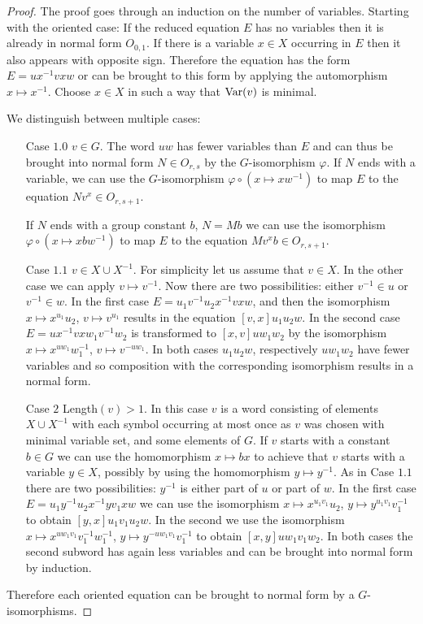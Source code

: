 \documentclass[a4paper,11pt]{amsart}
\begin{document}
\begin{proof}
  The proof goes through an induction on the number of variables.
  Starting with the oriented case: If the reduced equation $E$ has no
  variables then it is already in normal form $O_{0,1}$. If there is a
  variable $x\in X$ occurring in $E$ then it also appears with
  opposite sign.  Therefore the equation has the form
  $E = ux^{-1}vxw$ or can be brought to this form by applying the
  automorphism $x \mapsto x^{-1}$. Choose $x\in X$ in such a way that
  $\textup{Var}(v)$ is minimal.
 
  We distinguish between multiple cases:
  \begin{itemize}
  \item[Case $1.0$] $v\in G$. The word $uw$ has fewer variables than
    $E$ and can thus be brought into normal form $N\in O_{r,s}$ by the
    $G$-isomorphism $\varphi$. If $N$ ends with a variable, we can use
    the $G$-isomorphism $\varphi \circ (x\mapsto xw^{-1}) $ to map $E$
    to the equation $Nv^x \in O_{r,s+1}$.
    
    If $N$ ends with a group constant $b$, $N=Mb$ we can use the
    isomorphism $\varphi \circ(x \mapsto xbw^{-1}) $ to map $E$ to the
    equation $Mv^xb\in O_{r,s+1}$.

  \item[Case $1.1$] $v\in X\cup X^{-1}$. For simplicity let us assume
    that $v\in X$. In the other case we can apply $v \mapsto v^{-1}$.
    Now there are two possibilities: either $v^{-1} \in u$ or
    $v^{-1} \in w$. In the first case $E= u_1v^{-1}u_2x^{-1}vxw$, and
    then the isomorphism $x \mapsto x^{u_1}u_2$, $v \mapsto v^{u_1}$
    results in the equation $[v,x]u_1u_2w$. In the second case
    $E= ux^{-1}vxw_1v^{-1}w_2$ is transformed to $[x,v]uw_1w_2$ by the
    isomorphism $x \mapsto x^{uw_1}w_1^{-1}$, $v\mapsto v^{-uw_1}$. In
    both cases $u_1u_2w$, respectively $uw_1w_2$ have fewer variables
    and so composition with the corresponding isomorphism results in a
    normal form.
  \item[Case $2$] Length$(v)>1$. In this case $v$ is a word consisting of
    elements $X\cup X^{-1}$ with each symbol occurring at most once as
    $v$ was chosen with minimal variable set, and some elements of
    $G$.  If $v$ starts with a constant $b\in G$ we can use the
    homomorphism $x\mapsto bx$ to achieve that $v$ starts with a
    variable $y\in X$, possibly by using the homomorphism 
    $y \mapsto y^{-1}$. As in Case
    $1.1$ there are two possibilities: $y^{-1}$ is either part of $u$
    or part of $w$. In the first case $E= u_1 y^{-1} u_2 x^{-1}yv_1xw$
    we can use the isomorphism $x\mapsto x^{u_1v_1}u_2$,
    $y\mapsto y^{u_1v_1}v_1^{-1}$ to obtain $[y,x]u_1v_1u_2w$. In the
    second we use the isomorphism
    $x\mapsto x^{uw_1v_1}v_1^{-1}w_1^{-1}$,
    $y\mapsto y^{-uw_1v_1}v_1^{-1}$ to obtain $[x,y]uw_1v_1w_2$. In
    both cases the second subword has again less variables and can be
    brought into normal form by induction.
  \end{itemize}
  Therefore each oriented equation can be brought to normal form by a
  $G$-iso\-mor\-phisms.


\end{proof}
\end{document}
